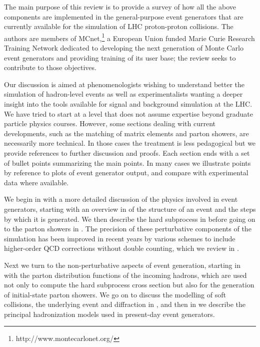 The main purpose of this review is to provide a survey of how all
the above components are implemented in the general-purpose event
generators that are currently available for the simulation of LHC
proton-proton collisions.  The authors are members of
MCnet,\footnote{http://www.montecarlonet.org/} a European Union funded
Marie Curie Research Training Network dedicated to developing the next
  generation of Monte Carlo event generators and providing training of
  its user base; the review seeks to contribute to those objectives.

Our discussion is aimed at phenomenologists wishing to understand better
the simulation of hadron-level events as well as experimentalists
wanting a deeper insight into the tools available for signal and
background simulation at the LHC.  We have tried to start at a level
that does not assume expertise beyond graduate particle physics
courses.  However, some sections dealing with current developments,
such as the matching of matrix elements and parton showers, are
necessarily more technical.  In those cases the treatment is less
pedagogical but we provide references to further discussion and proofs. 
Each section ends with a set of bullet points summarizing the main
points. In many cases we illustrate points by reference to plots of event
generator output, and compare with experimental data where available.

We begin in  with a more detailed
discussion of the physics involved in event generators, starting with
an overview in  of the structure of an event
and the steps by which it is generated.  We then describe the hard
subprocess in  before going on to the
parton showers in . The precision of these
perturbative components of the simulation has been improved in recent
years by various schemes to include higher-order QCD corrections
without double counting, which we review in
.

Next we turn to the non-perturbative aspects of event generation,
starting in  with the parton distribution
functions of the incoming hadrons, which are used not only to compute
the hard subprocess cross section but also for the generation of
initial-state parton showers.  We go on to discuss the modelling of
soft collisions, the underlying event and diffraction in
, and then in 
we describe the principal hadronization models used in present-day
event generators.

